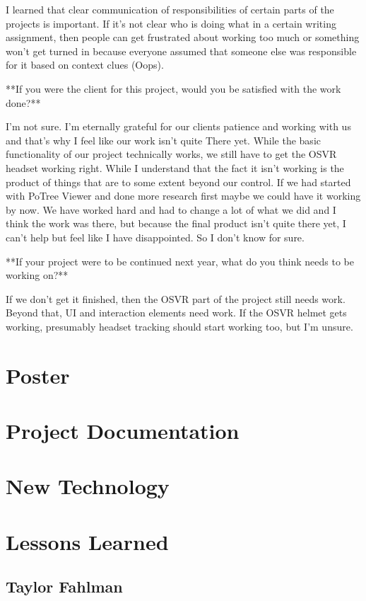 \documentclass[draftclsnofoot,onecolumn]{IEEEtran}
\begin{document}
I learned that clear communication of responsibilities of certain parts of the projects is important. If it's not clear who is doing what in a certain writing assignment, then people can get frustrated about working too much or something won't get turned in because everyone assumed that someone else was responsible for it based on context clues (Oops).

**If you were the client for this project, would you be satisfied with the work done?**

I'm not sure. I'm eternally grateful for our clients patience and working with us and that's why I feel like our work isn't quite There yet. While the basic functionality of our project technically works, we still have to get the OSVR headset working right. While I understand that the fact it isn't working is the product of things that are to some extent beyond our control. If we had started with PoTree Viewer and done more research first maybe we could have it working by now. We have worked hard and had to change a lot of what we did and I think the work was there, but because the final product isn't quite there yet, I can't help but feel like I have disappointed. So I don't know for sure.

**If your project were to be continued next year, what do you think needs to be working on?**

If we don't get it finished, then the OSVR part of the project still needs work. Beyond that, UI and interaction elements need work. If the OSVR helmet gets working, presumably headset tracking should start working too, but I'm unsure. 

\section{Poster}

\section{Project Documentation}

\section{New Technology}

\section{Lessons Learned}

\subsection{Taylor Fahlman}
\end{document}
